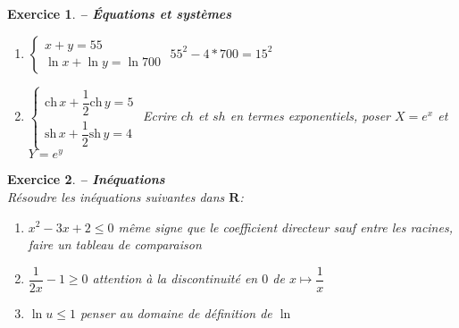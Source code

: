 \documentclass[a4paper,11pt]{article}
\newcommand{\ch}{\mathrm{ch}\,}
\newcommand{\sh}{\mathrm{sh}\,}
\newenvironment{alphate}{\begin{enumerate}[label=\alph*)]}{\end{enumerate}}
\newtheorem{exo}{Exercice}
\newenvironment{exercice}{\begin{exo} \em}{\end{exo}}
\begin{document}
\begin{exercice} {\bf -- \'Equations et syst\`emes}
\begin{alphate}
    5 solutions
\item $\left\{\begin{array}{l} x+y=55 \\ \ln x +\ln y=\ln 700 \end{array}\right.$ \hspace{1cm} 
    $55^2 -4*700 = 15^2$
\item $\left\{\begin{array}{l} \ch x+\dfrac{1}{2}\ch y=5 \\ \sh x+\dfrac{1}{2}\sh y=4 \end{array}\right. $ \hspace{1cm} 
Ecrire $ch$ et $sh$ en termes exponentiels, poser $X = e^x$ et $Y = e^y$

\hspace{1cm} 
\end{alphate}
\end{exercice}
\bigskip

\begin{exercice} {\bf -- In\'equations} \\ 
R\'esoudre les in\'equations suivantes dans $\mathbf{R}$:
\begin{alphate}
\addtocounter{enumi}{1}
\item $x^2-3x+2 \leq 0$ \hspace{1cm} 
    même signe que le coefficient directeur sauf entre les racines, faire un tableau de comparaison
\addtocounter{enumi}{1}
\item $\dfrac{1}{2x}-1 \geq 0$ \hspace{1cm}
    attention à la discontinuité en $0$ de $x \mapsto \dfrac{1}{x}$
\addtocounter{enumi}{1}
\item $\ln u \leq 1$ \hspace{1cm} 
    penser au domaine de définition de $\ln$
\end{alphate}
\end{exercice}
\bigskip 
\end{document}
